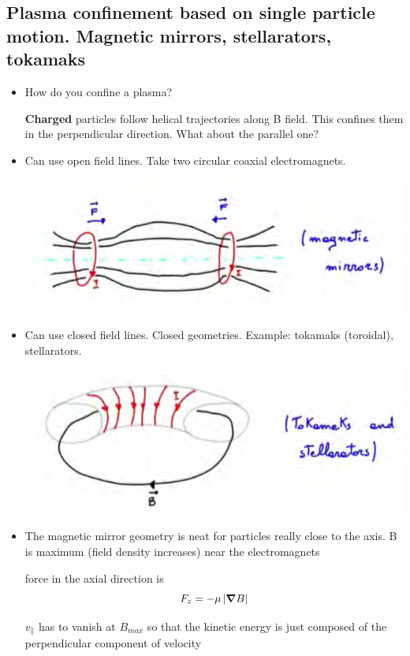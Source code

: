 \documentclass[PlasmaNotes.tex]{subfiles}
\begin{document}
	\subsection{Plasma confinement based on single particle motion. Magnetic mirrors, stellarators, tokamaks}
	\begin{itemize}
	\item How do you confine a plasma?
	
	\textbf{Charged} particles follow helical trajectories along B field. This confines them in the perpendicular direction. What about the parallel one?
	\item Can use open field lines. Take two circular coaxial electromagnets.
	
	\includegraphics[width=\linewidth]{magneticmirror}
	
	\item Can use closed field lines. Closed geometries. Example: tokamaks (toroidal), stellarators.
	
	\includegraphics[width=\linewidth]{tokamakconfinement}
	
	\item The magnetic mirror geometry is neat for particles really close to the axis. B is maximum (field density increases) near the electromagnets
	
	force in the axial direction is \[F_z =-\mu\left| \mbox{\boldmath$ \nabla $} B \right|\]
	
	$v_{\parallel}$ has to vanish at $B_{max}$ so that the kinetic energy is just composed of the perpendicular component of velocity
	

\end{itemize}
\end{document}
